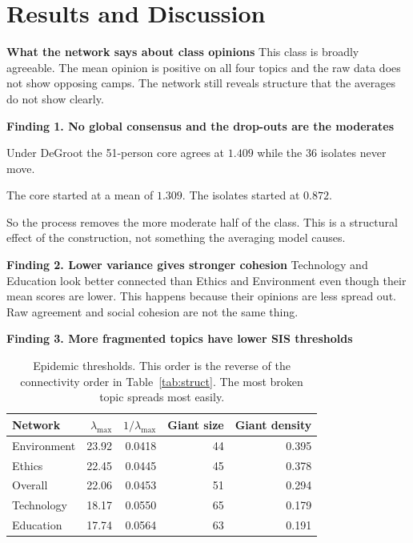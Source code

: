 \documentclass[11pt,a4paper]{article}
\newcommand{\gc}[1]{\cellcolor{hi}#1}
\newcommand{\rc}[1]{\cellcolor{lo}#1}
\newcommand{\lab}[1]{\textbf{#1}}
\begin{document}
\section{Results and Discussion}
\label{sec:results}

\lab{What the network says about class opinions} This class is broadly
agreeable. The mean opinion is positive on all four topics and the raw data
does not show opposing camps. The network still reveals structure that the
averages do not show clearly.

\lab{Finding 1. No global consensus and the drop-outs are the moderates}
\begin{dash}
  \item Under DeGroot the 51-person core agrees at $1.409$ while the 36 isolates
  never move.
  \item The core started at a mean of $1.309$. The isolates started at $0.872$.
  \item So the process removes the more moderate half of the class. This is a
  structural effect of the construction, not something the averaging model
  causes.
\end{dash}

\lab{Finding 2. Lower variance gives stronger cohesion} Technology and Education
look better connected than Ethics and Environment even though their mean scores
are lower. This happens because their opinions are less spread out. Raw
agreement and social cohesion are not the same thing.

\lab{Finding 3. More fragmented topics have lower SIS thresholds}

\begin{table}[!ht]
\centering\small
\begin{tabular}{@{}lrrrr@{}}
\toprule
\sffamily\bfseries Network & \sffamily $\lambda_{\max}$ &
\sffamily $1/\lambda_{\max}$ & \sffamily Giant size & \sffamily Giant density \\
\midrule
Environment & \gc{23.92} & \gc{0.0418} & \rc{44} & \gc{0.395} \\
Ethics      & 22.45 & 0.0445 & 45 & 0.378 \\
Overall     & 22.06 & 0.0453 & 51 & 0.294 \\
Technology  & 18.17 & 0.0550 & \gc{65} & 0.179 \\
Education   & \rc{17.74} & \rc{0.0564} & 63 & \rc{0.191} \\
\bottomrule
\end{tabular}
\caption{Epidemic thresholds. This order is the reverse of the connectivity
order in Table~\ref{tab:struct}. The most broken topic spreads most easily.}
\label{tab:epi}
\end{table}
\end{document}
